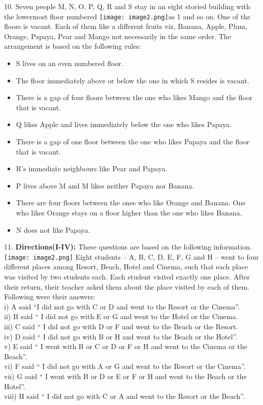\documentclass[
]{article}
\begin{document}
10. Seven people M, N, O, P, Q, R and S stay in an eight storied building with the lowermost
floor numbered \texttt{[image: image2.png]}as 1 and so on. One of the floors is vacant. Each of them like a different
fruits viz, Banana, Apple, Plum, Orange, Papaya, Pear and Mango not necessarily in the
same order. The arrangement is based on the following rules:\\
\begin{itemize}

\item S lives on an even numbered floor.
\item The floor immediately above or below the one in which S resides is vacant.
\item There is a gap of four floors between the one who likes Mango and the floor that is vacant.
\item Q likes Apple and lives immediately below the one who likes Papaya.
\item There is a gap of one floor between the one who likes Papaya and the floor that is vacant.
\item R's immediate neighbours like Pear and Papaya.
\item P lives above M and M likes neither Papaya nor Banana.
\item There are four floors between the ones who like Orange and Banana. One who likes
Orange stays on a floor higher than the one who likes Banana.
\item N does not like Papaya.
\end{itemize}

11. \textbf{Directions(I-IV):} These questions are based on the following information.\\
\texttt{[image: image2.png]}
Eight students – A, B, C, D, E, F, G and H – went to four different places among Resort,
Beach, Hotel and Cinema, such that each place was visited by two students each.
Each student visited exactly one place. After their return, their teacher asked them about the
place visited by each of them. Following were their answers:\\
i) A said “I did not go with C or D and went to the Resort or the Cinema”.\\
ii) B said “ I did not go with E or G and went to the Hotel or the Cinema.\\
iii) C said “ I did not go with D or F and went to the Beach or the Resort.\\
iv) D said “ I did not go with B or H and went to the Beach or the Hotel”.\\
v) E said “ I went with B or C or D or F or H and went to the Cinema or the Beach”.\\
vi) F said “ I did not go with A or G and went to the Resort or the Cinema”.\\
vii) G said “ I went with B or D or E or F or H and went to the Beach or the Hotel”.\\
viii) H said “ I did not go with C or A and went to the Resort or the Beach”.\\
\end{document}
